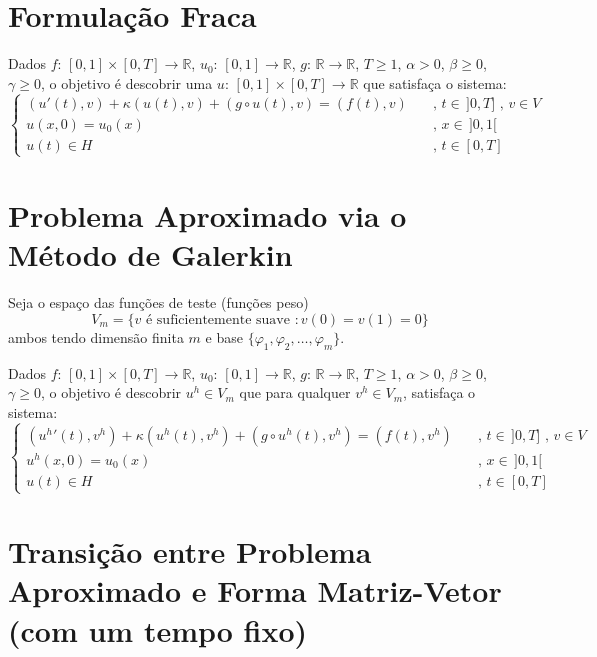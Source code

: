 \documentclass[a4paper]{article}
\newcommand{\typ}{:\,}
\newcommand{\vphi}{\varphi}
\begin{document}
\section{Formulação Fraca}

Dados
\(f \typ [0, 1] \times [0, T] \to \mathbb{R}\),
\(u_0 \typ [0, 1] \to \mathbb{R}\),
\(g \typ \mathbb{R} \to \mathbb{R}\),
\(T \ge 1\),
\(\alpha > 0\),
\(\beta \ge 0\),
\(\gamma \ge 0\),
o objetivo é descobrir
uma \(u \typ [0, 1] \times [0, T] \to \mathbb{R}\)
que satisfaça o sistema:
\[ \begin{cases}
    (u'(t), v)
    + \kappa(u(t), v)
    + (g \circ u(t), v)
    = (f(t), v)
        &\quad\text{, } t \in \,]0, T] \text{ , } v \in V
    \\
    u(x, 0) = u_0(x)
        &\quad\text{, } x \in \,]0, 1[
    \\
    u(t) \in H
        &\quad\text{, } t \in [0, T]
\end{cases} \]

\section{Problema Aproximado via o Método de Galerkin}

Seja o espaço das funções de teste (funções peso)
\[
    V_m = \{
        v \text{ é suficientemente suave } : v(0) = v(1) = 0
    \}
\]
ambos tendo dimensão finita \(m\)
e base \(\{ \vphi_1, \vphi_2, \dots, \vphi_m\}\).

Dados
\(f \typ [0, 1] \times [0, T] \to \mathbb{R}\),
\(u_0 \typ [0, 1] \to \mathbb{R}\),
\(g \typ \mathbb{R} \to \mathbb{R}\),
\(T \ge 1\),
\(\alpha > 0\),
\(\beta \ge 0\),
\(\gamma \ge 0\),
o objetivo é descobrir \(u^h \in V_m\)
que para qualquer \(v^h \in V_m\),
satisfaça o sistema:
\[ \begin{cases}
    (u^h{}'(t), v^h)
    + \kappa(u^h(t), v^h)
    + (g \circ u^h(t), v^h)
    = (f(t), v^h)
        &\quad\text{, } t \in \,]0, T] \text{ , } v \in V
    \\
    u^h(x, 0) = u_0(x)
        &\quad\text{, } x \in \,]0, 1[
    \\
    u(t) \in H
        &\quad\text{, } t \in [0, T]
\end{cases} \]

\section{Transição entre Problema Aproximado e Forma Matriz-Vetor (com um tempo fixo)}
\end{document}
